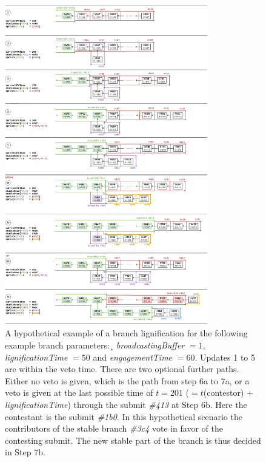 \documentclass[14pt]{article}
\begin{document}
\begin{figure}[h!]
  \begin{center}
    \includegraphics[width=0.79\textwidth]{src/img/LignificationProcessV6.png}
\end{center}
 \caption{A hypothetical example of a branch lignification for the following example branch parameters:¸ \textit{broadcastingBuffer} $=1$, \textit{lignificationTime} $=50$ and \textit{engagementTime} $=60$. Updates 1 to 5 are within the veto time. There are two optional further paths. Either no veto is given, which is the path from step 6a to 7a, or a veto is given at the last possible time of $t=201$ ($=t$(contestor) + \textit{lignificationTime}) through the submit \textit{\#413} at Step 6b. Here the contestant is the submit \textit{\#1b0}. In this hypothetical scenario the contributors of the stable branch \textit{\#3c4} vote in favor of the contesting submit. The new stable part of the branch is thus decided in Step 7b.}
 \label{fig:bufferbranches}
\end{figure}


\end{document}
